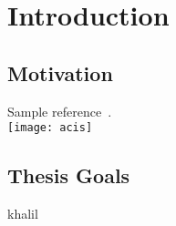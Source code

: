 \chapter{Introduction}

\section{Motivation}
Sample reference~\cite{Weng98}.\\
\texttt{[image: acis]}
\section{Thesis Goals}
khalil
